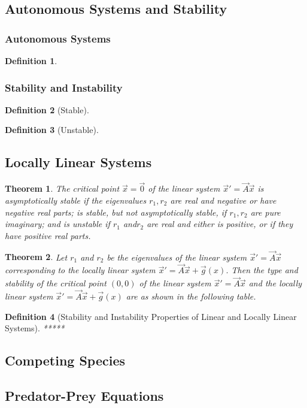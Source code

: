 \documentclass[10pt]{report}
\newtheorem{thm3}{Theorem}[subsection]
\newtheorem{def3}{Definition}[subsection]
\begin{document}
\subsection{Autonomous Systems and Stability}
\subsubsection{Autonomous Systems}
\begin{def3}
\end{def3}
\subsubsection{Stability and Instability}
\begin{def3}[Stable]
\end{def3}
\begin{def3}[Unstable]
\end{def3}
\subsection{Locally Linear Systems}
\begin{thm3}
The critical point $\vec{x}=\vec{0}$ of the linear system $\vec{x}' = \vec{A}\vec{x}$ is asymptotically stable if the eigenvalues $r_1,r_2$ are real and negative or have negative real parts; is stable, but not asymptotically stable, if $r_1,r_2$ are pure imaginary; and is unstable if $r_1$ and$r_2$ are real and either is positive, or if they have positive real parts.
\end{thm3}
\begin{thm3}
Let $r_1$ and $r_2$ be the eigenvalues of the linear system $\vec{x}' = \vec{A}\vec{x}$ corresponding to the locally linear system $\vec{x}' = \vec{A}\vec{x} +\vec{g}(x)$. Then the type and stability of the critical point $(0,0)$ of the linear system $\vec{x}' = \vec{A}\vec{x}$ and the locally linear system $\vec{x}' = \vec{A}\vec{x} + \vec{g}(x)$ are as shown in the following table.
\end{thm3}
\begin{def3}[Stability and Instability Properties of Linear and Locally Linear Systems]
*****
\end{def3}
\subsection{Competing Species}
\subsection{Predator-Prey Equations}
\end{document}
